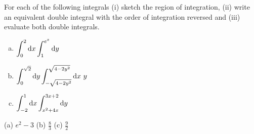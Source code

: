 \begin{question}
For each of the following integrals (i) sketch the region of integration,
(ii) write an equivalent double integral with the order of integration reversed and (iii) evaluate both double integrals.
\begin{enumerate}[(a)]
\item  $\displaystyle\int_0^2\mathrm{d}x\int_1^{e^x}\mathrm{d}y$
\item  $\displaystyle\int_0^{\sqrt{2}}\dee{y}
               \int_{-\sqrt{4-2y^2}}^{\sqrt{4-2y^2}}\dee{x}\ y$
\item  $\displaystyle\int_{-2}^1 \mathrm{d}x\int_{x^2+4x}^{3x+2}\mathrm{d}y$
\end{enumerate}
\end{question}

%

\begin{answer}
(a) $e^2-3$ \qquad
(b) $\frac{8}{3}$ \qquad
(c) $\frac{9}{2}$
\end{answer}

